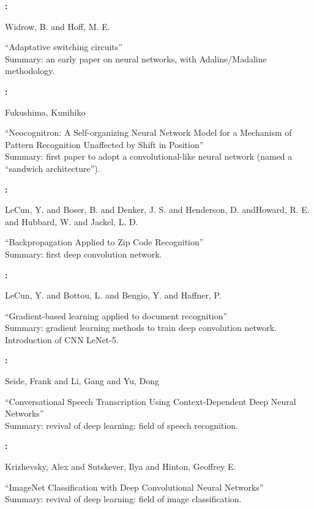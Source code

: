 \textbf{\cite{Widrow1960}:}

Widrow, B. and Hoff, M. E.

``Adaptative switching circuits''\\
Summary: an early paper on neural networks, with Adaline/Madaline methodology.
 


\textbf{\cite{Fukushima1980}:}

Fukushima, Kunihiko

``Neocognitron: A Self-organizing Neural Network Model for a Mechanism of Pattern Recognition Unaffected by Shift in Position''\\
Summary: first paper to adopt a convolutional-like neural network (named a ``sandwich architecture'').
 


\textbf{\cite{LeCun1989}:}

LeCun, Y. and Boser, B. and Denker, J. S. and Henderson, D. andHoward, R. E. and Hubbard, W. and Jackel, L. D.

``Backpropagation Applied to Zip Code Recognition''\\
Summary: first deep convolution network.


\pagebreak

\textbf{\cite{LeCun1998}:}

LeCun, Y. and Bottou, L. and Bengio, Y. and Haffner, P.

``Gradient-based learning applied to document recognition''\\
Summary: gradient learning methods to train deep convolution network. Introduction of CNN LeNet-5.



\textbf{\cite{Seide2011}:}

Seide, Frank and Li, Gang and Yu, Dong

``Conversational Speech Transcription Using Context-Dependent Deep Neural Networks''\\
Summary: revival of deep learning: field of speech recognition.



\textbf{\cite{Krizhevsky2012}:}

Krizhevsky, Alex and Sutskever, Ilya and Hinton, Geoffrey E.

``ImageNet Classification with Deep Convolutional Neural Networks''\\
Summary: revival of deep learning: field of image classification.



